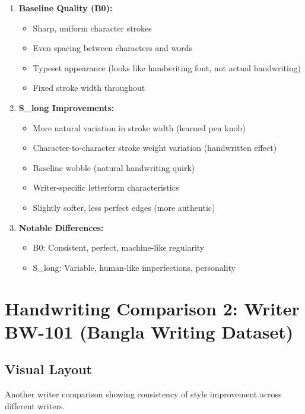 \documentclass[11pt,a4paper]{article}
\begin{document}
\begin{enumerate}
  \item \textbf{Baseline Quality (B0):}
  \begin{itemize}
    \item Sharp, uniform character strokes
    \item Even spacing between characters and words
    \item Typeset appearance (looks like handwriting font, not actual handwriting)
    \item Fixed stroke width throughout
  \end{itemize}

  \item \textbf{S\_long Improvements:}
  \begin{itemize}
    \item More natural variation in stroke width (learned pen knob)
    \item Character-to-character stroke weight variation (handwritten effect)
    \item Baseline wobble (natural handwriting quirk)
    \item Writer-specific letterform characteristics
    \item Slightly softer, less perfect edges (more authentic)
  \end{itemize}

  \item \textbf{Notable Differences:}
  \begin{itemize}
    \item B0: Consistent, perfect, machine-like regularity
    \item S\_long: Variable, human-like imperfections, personality
  \end{itemize}
\end{enumerate}

\newpage

\section{Handwriting Comparison 2: Writer BW-101 (Bangla Writing Dataset)}

\subsection*{Visual Layout}

Another writer comparison showing consistency of style improvement across different writers.
\end{document}
